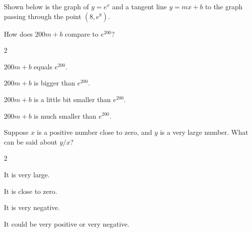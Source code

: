 \documentclass[12pt]{ximera}
\renewenvironment{multipleChoice}
{\begin{trivlist}\item[\hskip\labelsep\small\bfseries Choose the best answer:]
\hfil\begin{enumerate}\begin{multicols}{2}}
 {\end{multicols}\end{enumerate}\end{trivlist}}
\renewcommand{\choice}[2][]{\item \begin{minipage}[t]{2in}#2\end{minipage}\ifthenelse{\boolean{#1}}{\ifhandout \else  \fi}{}}
\begin{document}
\begin{minipage}{\textwidth}
\begin{problem}

  Shown below is the graph of $y = e^x$ and a tangent line $y = mx + b$ to the graph passing through the point $(8,e^8)$.
  \begin{image}
  \end{image}
  How does $200m + b$ compare to $e^{200}$?
  \begin{multipleChoice}
    \choice{$200m + b$ equals $e^{200}$.}
    \choice{$200m + b$ is bigger than $e^{200}$.}
    \choice{$200m + b$ is a little bit smaller than $e^{200}$.}
    \choice[correct]{$200m + b$ is much smaller than $e^{200}$.}
  \end{multipleChoice}
\end{problem}
\end{minipage}

\vspace{6ex}

\begin{minipage}{\textwidth}
\begin{problem}

  Suppose $x$ is a positive number close to zero, and $y$ is a very large number.  What can be said about $y/x$?
  \begin{multipleChoice}
    \choice[correct]{It is very large.}
    \choice{It is close to zero.}
    \choice{It is very negative.}
    \choice{It could be very positive or very negative.}
  \end{multipleChoice}
\end{problem}
\end{minipage}
\end{document}
